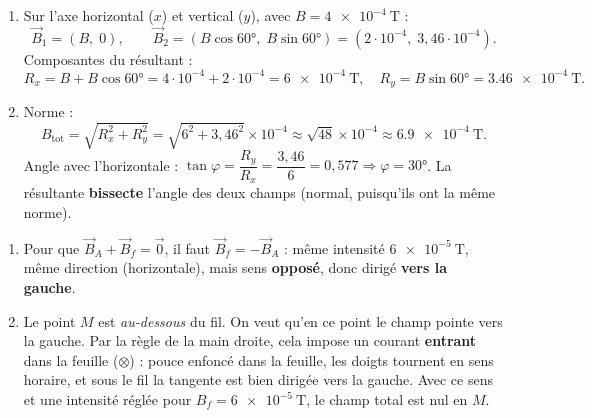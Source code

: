 \documentclass[11pt,a4paper]{article}
\newcommand{\vv}[1]{\vec{#1}}\newcommand{\ds}{\displaystyle}
\begin{document}
\begin{corrige}
\begin{enumerate}[label=\alph*)]
  \item Sur l'axe horizontal ($x$) et vertical ($y$), avec $B=\qty{4e-4}{\tesla}$ :
        \[ \vv{B}_1=(B,\;0),\qquad \vv{B}_2=(B\cos\ang{60},\;B\sin\ang{60})=(2\cdot10^{-4},\;3{,}46\cdot10^{-4}). \]
        Composantes du résultant :
        \[ R_x=B+B\cos\ang{60}=4\cdot10^{-4}+2\cdot10^{-4}=\qty{6e-4}{\tesla},\quad
           R_y=B\sin\ang{60}=\qty{3.46e-4}{\tesla}. \]
  \item Norme :
        \[ B_{\text{tot}}=\sqrt{R_x^2+R_y^2}=\sqrt{6^2+3{,}46^2}\times10^{-4}
           \approx\sqrt{48}\times10^{-4}\approx\qty{6.9e-4}{\tesla}. \]
        Angle avec l'horizontale : $\tan\varphi=\dfrac{R_y}{R_x}=\dfrac{3{,}46}{6}=0{,}577
        \Rightarrow \varphi=\ang{30}$. La résultante \textbf{bissecte} l'angle des deux champs
        (normal, puisqu'ils ont la même norme).
\end{enumerate}
\end{corrige}

\begin{corrige}
\begin{enumerate}[label=\alph*)]
  \item Pour que $\vv{B}_A+\vv{B}_f=\vv{0}$, il faut $\vv{B}_f=-\vv{B}_A$ : même intensité
        $\qty{6e-5}{\tesla}$, même direction (horizontale), mais sens \textbf{opposé}, donc dirigé
        \textbf{vers la gauche}.
  \item Le point $M$ est \emph{au-dessous} du fil. On veut qu'en ce point le champ pointe vers la
        gauche. Par la règle de la main droite, cela impose un courant \textbf{entrant} dans la feuille
        ($\otimes$) : pouce enfoncé dans la feuille, les doigts tournent en sens horaire, et sous le
        fil la tangente est bien dirigée vers la gauche. Avec ce sens et une intensité réglée pour
        $B_f=\qty{6e-5}{\tesla}$, le champ total est nul en $M$.
\end{enumerate}
\end{corrige}
\end{document}
